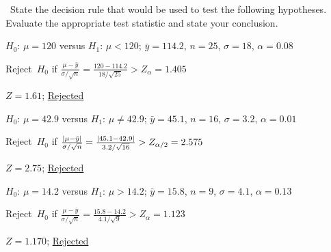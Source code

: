 \begin{problem}
  ~State the decision rule that would be used to test the following hypotheses.  Evaluate the appropriate test statistic and state your conclusion.
\end{problem}

\begin{subproblem}
  $H_0$: ${\mu = 120}$ versus $H_1$: ${\mu < 120}$; ${\bar{y} = 114.2}$, ${n = 25}$, ${\sigma = 18}$, ${\alpha = 0.08}$
\end{subproblem}

\noindent
Reject~$H_0$ if ${\frac{\mu - \bar{y}}{\sigma / \sqrt{n}} = \frac{120 - 114.2}{18 / \sqrt{25}} > Z_{\alpha} = 1.405}$

\noindent
${Z = 1.61}$; \underline{Rejected}

\begin{subproblem}
  $H_0$: ${\mu = 42.9}$ versus $H_1$: ${\mu \ne 42.9}$; ${\bar{y} = 45.1}$, ${n = 16}$, ${\sigma = 3.2}$, ${\alpha = 0.01}$
\end{subproblem}

\noindent
Reject~$H_0$ if ${\frac{\lvert\mu - \bar{y}\rvert}{\sigma / \sqrt{n}} = \frac{\lvert45.1 - 42.9\rvert}{3.2 / \sqrt{16}} > Z_{\alpha/2} = 2.575}$

\noindent
${Z = 2.75}$; \underline{Rejected}

\begin{subproblem}
  $H_0$: ${\mu = 14.2}$ versus $H_1$: ${\mu > 14.2}$; ${\bar{y} = 15.8}$, ${n = 9}$, ${\sigma = 4.1}$, ${\alpha = 0.13}$
\end{subproblem}

\noindent
Reject~$H_0$ if ${\frac{\mu - \bar{y}}{\sigma / \sqrt{n}} = \frac{15.8 - 14.2}{4.1 / \sqrt{9}} > Z_{\alpha} = 1.123}$

\noindent
${Z = 1.170}$; \underline{Rejected}
